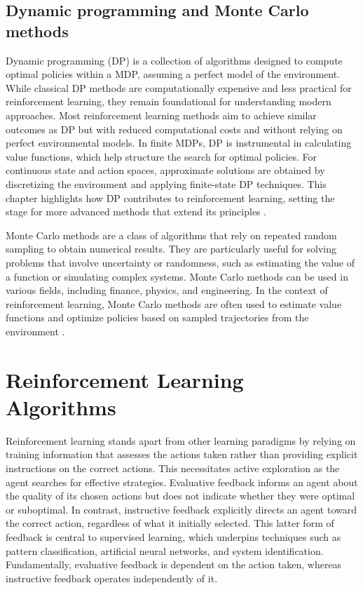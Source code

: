 \subsection{Dynamic programming and Monte Carlo methods}
Dynamic programming (DP) is a collection of algorithms designed to compute optimal policies within a MDP, assuming a perfect model of the environment. While classical DP methods are computationally expensive and less practical for reinforcement learning, they remain foundational for understanding modern approaches. Most reinforcement learning methods aim to achieve similar outcomes as DP but with reduced computational costs and without relying on perfect environmental models. In finite MDPs, DP is instrumental in calculating value functions, which help structure the search for optimal policies. For continuous state and action spaces, approximate solutions are obtained by discretizing the environment and applying finite-state DP techniques. This chapter highlights how DP contributes to reinforcement learning, setting the stage for more advanced methods that extend its principles \cite{dynamic_programing}.

Monte Carlo methods are a class of algorithms that rely on repeated random sampling to obtain numerical results. They are particularly useful for solving problems that involve uncertainty or randomness, such as estimating the value of a function or simulating complex systems. Monte Carlo methods can be used in various fields, including finance, physics, and engineering. In the context of reinforcement learning, Monte Carlo methods are often used to estimate value functions and optimize policies based on sampled trajectories from the environment \cite{Sutton2018}.

\section{Reinforcement Learning Algorithms}
Reinforcement learning stands apart from other learning paradigms by relying on training information that assesses the actions taken rather than providing explicit instructions on the correct actions. This necessitates active exploration as the agent searches for effective strategies. Evaluative feedback informs an agent about the quality of its chosen actions but does not indicate whether they were optimal or suboptimal. In contrast, instructive feedback explicitly directs an agent toward the correct action, regardless of what it initially selected. This latter form of feedback is central to supervised learning, which underpins techniques such as pattern classification, artificial neural networks, and system identification. Fundamentally, evaluative feedback is dependent on the action taken, whereas instructive feedback operates independently of it.

